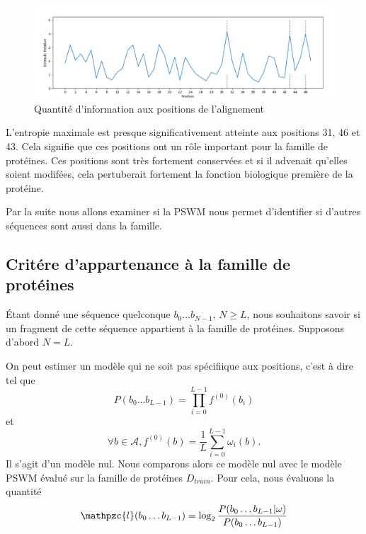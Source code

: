 \documentclass[a4paper, french]{article}
\begin{document}
\begin{figure}[h]
\begin{center}
    \includegraphics[width=14cm]{images/shannon_relative}
    \caption{Quantit\'e d'information aux positions de l'alignement}
    \label{fig:shannon_relative}
\end{center}
\end{figure}

L'entropie maximale est presque significativement atteinte aux positions
31, 46 et 43. Cela signifie que ces positions ont un r\^ole important
pour la famille de prot\'eines. Ces positions sont tr\`es fortement conserv\'ees
et si il advenait qu'elles soient modif\'ees, cela pertuberait fortement
la fonction biologique premi\`ere de la prot\'eine.

Par la suite nous allons examiner si la PSWM nous permet d'identifier
si d'autres s\'equences sont aussi dans la famille.

\subsection{Crit\'ere d'appartenance \`a la famille de prot\'eines}

\'Etant donn\'e une s\'equence quelconque $b_0\ldots b_{N-1}$, $N\geq L$,
nous souhaitons savoir si un fragment de cette s\'equence appartient
\`a la famille de prot\'eines. Supposons d'abord $N=L$.

On peut estimer un mod\`ele qui ne soit pas sp\'ecifiique aux positions,
c'est \`a dire tel que
\begin{equation*}
    P(b_0\ldots b_{L-1}) = \prod_{i=0}^{L-1} f^{(0)}(b_i)
\end{equation*}
et
\begin{equation*}
    \forall{b\in \mathcal{A}},
    f^{(0)}(b)=\frac{1}{L}\sum_{i=0}^{L-1}\omega_i(b).
\end{equation*}
Il s'agit d'un mod\`ele nul.
Nous comparons alors ce mod\`ele nul avec le mod\`ele PSWM \'evalu\'e sur
la famille de prot\'eines $D_{train}$. Pour cela, nous \'evaluons la quantit\'e
\newcommand{\lodd}{\mathpzc{l}}
\begin{equation*}
    \lodd(b_0\ldots b_{L-1}) = \log_2
    \frac{P(b_0\ldots b_{L-1}|\omega)}{P(b_0\ldots b_{L-1})}
\end{equation*}
\end{document}
